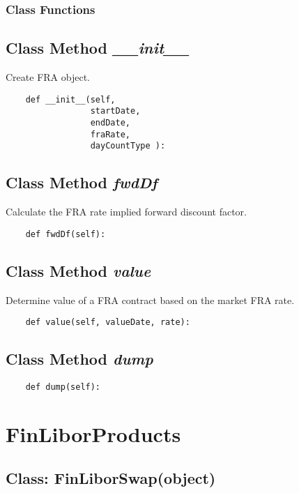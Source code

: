 \documentclass[twoside,11pt]{book}
\begin{document}
\subsubsection{Class Functions}

\subsection{Class Method {\it \_\_init\_\_}}
Create FRA object. 

\begin{lstlisting}
    def __init__(self, 
                 startDate, 
                 endDate, 
                 fraRate, 
                 dayCountType ):
\end{lstlisting}

\subsection{Class Method {\it fwdDf}}
Calculate the FRA rate implied forward discount factor. 

\begin{lstlisting}
    def fwdDf(self):
\end{lstlisting}

\subsection{Class Method {\it value}}
Determine value of a FRA contract based on the market FRA rate. 

\begin{lstlisting}
    def value(self, valueDate, rate):
\end{lstlisting}

\subsection{Class Method {\it dump}}


\begin{lstlisting}
    def dump(self):
\end{lstlisting}

\newpage
\section{FinLiborProducts}

\subsection{Class: FinLiborSwap(object)}
\end{document}
